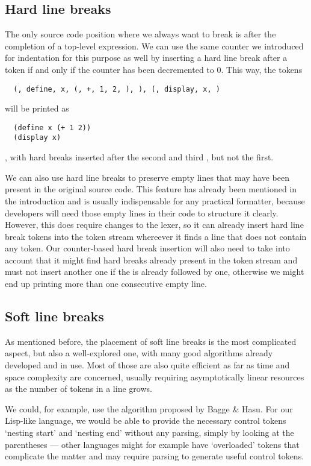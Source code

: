 \subsection{Hard line breaks}
The only source code position where we always want to break
is after the completion of a top-level expression.
We can use the same counter we introduced for indentation for this purpose as well
by inserting a hard line break after a  token if and only if
the counter has been decremented to 0.
This way, the tokens
\begin{verbatim}
  (, define, x, (, +, 1, 2, ), ), (, display, x, )
\end{verbatim}
will be printed as
\begin{verbatim}
  (define x (+ 1 2))
  (display x)
\end{verbatim}
, with hard breaks inserted after the second and third , but not the first.

We can also use hard line breaks to preserve empty lines
that may have been present in the original source code.
This feature has already been mentioned in the introduction and
is usually indispensable for any practical formatter,
because developers will need those empty lines in their code to structure it clearly.
However, this does require changes to the lexer,
so it can already insert hard line break tokens into the token stream
whereever it finds a line that does not contain any token.
Our counter-based hard break insertion will also need to take into account
that it might find hard breaks already present in the token stream
and must not insert another one if the  is already followed by one,
otherwise we might end up printing more than one consecutive empty line.

\subsection{Soft line breaks}
As mentioned before, the placement of soft line breaks is the most complicated aspect,
but also a well-explored one, with many good algorithms already developed and in use.
Most of those are also quite efficient as far as time and space complexity are concerned,
usually requiring asymptotically linear resources as the number of tokens in a line grows.

We could, for example, use the algorithm proposed by Bagge \& Hasu.
\autocite[Chapter: Line Breaking]{prettyGoodFormattingPipeline}
For our Lisp-like language, we would be able to provide the necessary control tokens
`nesting start' and `nesting end' without any parsing, simply by looking at the parentheses
--- other languages might for example have `overloaded' tokens that complicate the matter
and may require parsing to generate useful control tokens.

